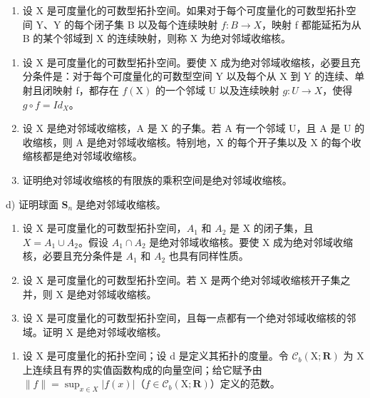 \begin{enumerate}
\def\labelenumi{\arabic{enumi})}
\setcounter{enumi}{6}
\tightlist
\item
  设 X 是可度量化的可数型拓扑空间。如果对于每个可度量化的可数型拓扑空间 Y、Y 的每个闭子集 B 以及每个连续映射 \(f: B \rightarrow X\)，映射 f 都能延拓为从 B 的某个邻域到 X 的连续映射，则称 X 为绝对邻域收缩核。
\end{enumerate}

\begin{enumerate}
\def\labelenumi{\alph{enumi})}
\item
  设 X 是可度量化的可数型拓扑空间。要使 X 成为绝对邻域收缩核，必要且充分条件是：对于每个可度量化的可数型空间 Y 以及每个从 X 到 Y 的连续、单射且闭映射 f，都存在 \(f(\mathrm{X})\) 的一个邻域 U 以及连续映射 \(g: U \to X\)，使得 \(g \circ f = Id_{X}\)。
\item
  设 X 是绝对邻域收缩核，A 是 X 的子集。若 A 有一个邻域 U，且 A 是 U 的收缩核，则 A 是绝对邻域收缩核。特别地，X 的每个开子集以及 X 的每个收缩核都是绝对邻域收缩核。
\item
  证明绝对邻域收缩核的有限族的乘积空间是绝对邻域收缩核。
\end{enumerate}

d) 证明球面 \(\mathbf{S}_n\) 是绝对邻域收缩核。

\begin{enumerate}
\def\labelenumi{\alph{enumi})}
\setcounter{enumi}{4}
\item
  设 X 是可度量化的可数型拓扑空间，\(A_{1}\) 和 \(A_{2}\) 是 X 的闭子集，且 \(X = A_{1} \cup A_{2}\)。假设 \(A_{1} \cap A_{2}\) 是绝对邻域收缩核。要使 X 成为绝对邻域收缩核，必要且充分条件是 \(A_{1}\) 和 \(A_{2}\) 也具有同样性质。
\item
  设 X 是可度量化的可数型拓扑空间。若 X 是两个绝对邻域收缩核开子集之并，则 X 是绝对邻域收缩核。
\item
  设 X 是可度量化的可数型拓扑空间，且每一点都有一个绝对邻域收缩核的邻域。证明 X 是绝对邻域收缩核。
\end{enumerate}

\begin{enumerate}
\def\labelenumi{\arabic{enumi})}
\setcounter{enumi}{7}
\tightlist
\item
  设 X 是可度量化的拓扑空间；设 d 是定义其拓扑的度量。令 \(\mathcal{C}_{b}(\mathrm{X};\mathbf{R})\) 为 X 上连续且有界的实值函数构成的向量空间；给它赋予由 \(\|f\| = \sup_{x \in X} |f(x)|\)（\(f \in \mathcal{C}_{b}(\mathrm{X};\mathbf{R})\)）定义的范数。
\end{enumerate}

